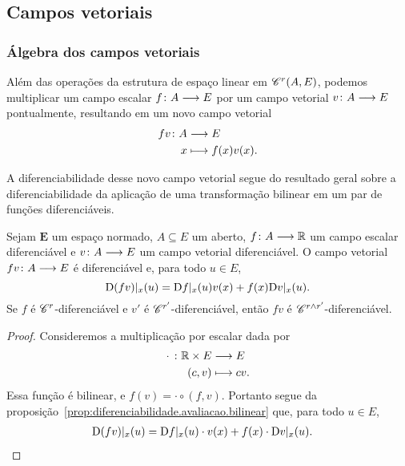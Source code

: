 \subsection{Campos vetoriais}

\subsubsection{Álgebra dos campos vetoriais}

Além das operações da estrutura de espaço linear em $\mathscr{C}^r(A,E)$, podemos multiplicar um campo escalar $f\colon \allowbreak A \longrightarrow E$ por um campo vetorial $v\colon \allowbreak A \longrightarrow E$ pontualmente, resultando em um novo campo vetorial
	\begin{align*}
	{fv}\colon {A} &\longrightarrow {E} \\{x} &\longmapsto f(x)v(x).
	\end{align*}

A diferenciabilidade desse novo campo vetorial segue do resultado geral sobre a diferenciabilidade da aplicação de uma transformação bilinear em um par de funções diferenciáveis.

\begin{proposition}
\label{prop:diferenciabilidade.contracao.escalar.vetor}
Sejam $\bm E$ um espaço normado, $A \subseteq E$ um aberto, $f\colon \allowbreak A \longrightarrow \mathbb{R}$ um campo escalar diferenciável e $v\colon \allowbreak A \longrightarrow E$ um campo vetorial diferenciável. O campo vetorial $fv\colon \allowbreak A \longrightarrow E$ é diferenciável e, para todo $u \in E$,
\begin{equation*}
	\mathrm{D} (fv)|_x(u) = \mathrm{D} f|_x(u) v(x) + f(x) \mathrm{D} v|_x(u).
\end{equation*}
Se $f$ é $\mathscr{C}^r$-diferenciável e $v'$ é $\mathscr{C}^{r'}$-diferenciável, então $fv$ é $\mathscr{C}^{r \mathbin{\wedge} r'}$-diferenciável.
\end{proposition}
\begin{proof}
Consideremos a multiplicação por escalar dada por
	\begin{align*}
	{\cdot\ }\colon {\mathbb{R}\times E} &\longrightarrow {E} \\{(c,v)} &\longmapsto cv.
	\end{align*}
Essa função é bilinear, e $f(v) = \cdot \circ (f, v)$. Portanto segue da proposição~\ref{prop:diferenciabilidade.avaliacao.bilinear} que, para todo $u \in E$,
	\begin{align*}
	\mathrm{D} (fv)|_x(u) &= \mathrm{D} f|_x(u) \cdot v(x) + f(x) \cdot \mathrm{D} v|_x(u).
	\qedhere
	\end{align*}
%
\end{proof}


